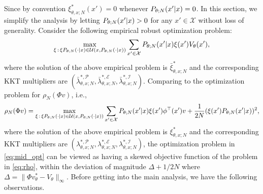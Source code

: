 Since by convention $\xi^*_{\theta,x;N}(x')=0$ whenever $P_{\theta;N}(x'|x) =0$. In this section, we simplify the analysis by letting $P_{\theta;N}(x'|x) >0$ for any $x'\in\mathcal X$ without loss of generality.
Consider the following empirical robust optimization problem:
\begin{equation}\label{eq:mid_opt}
\max_{\xi\,:\,\xi P_{\theta;N}(\cdot |x)\in {\mathcal{U}}(x,P_{\theta;N}(\cdot |x))} \sum_{x'\in\mathcal X} P_{\theta;N}(x'|x) \xi(x')V_\theta(x'),
\end{equation}
where the solution of the above empirical problem is $\bar\xi^*_{\theta,x;N}$ and the corresponding KKT multipliers are $(\bar\lambda^{*,\mathcal P}_{\theta,x;N},\bar\lambda^{*,\mathcal E}_{\theta,x;N},\bar\lambda^{*,\mathcal I}_{\theta,x;N})$. Comparing to the optimization problem for $\rho_N(\Phi v)$, i.e.,
\begin{equation}\label{eq:rho}
\rho_N(\Phi v)=\max_{\xi\,:\,\xi P_{\theta;N}(\cdot |x)\in {\mathcal{U}}(x,P_{\theta;N}(\cdot |x))} \sum_{x'\in\mathcal X} P_{\theta;N}(x'|x) \xi(x')\phi^\top(x')v+\frac{1}{2N}(\xi(x')P_{\theta;N}(x'|x))^2,
\end{equation}
where the solution of the above empirical problem is $\xi^*_{\theta,x;N}$ and the corresponding KKT multipliers are $(\lambda^{*,\mathcal P}_{\theta,x;N},\lambda^{*,\mathcal E}_{\theta,x;N},\lambda^{*,\mathcal I}_{\theta,x;N})$,
the optimization problem in \eqref{eq:mid_opt} can be viewed as having a skewed objective function of the problem in \eqref{eq:rho}, within the deviation of magnitude $\Delta+1/2N$ where $\Delta=\|\Phi v^*_\theta-V_\theta\|_\infty$. Before getting into the main analysis, we have the following observations.
